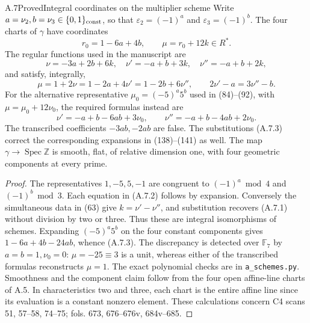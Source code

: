 \begin{statement}{A.7}{Proved}{Integral coordinates on the multiplier scheme}
Write $a=\nu_2,b=\nu_3\in\{0,1\}_{\rm const}$, so that
$\varepsilon_2=(-1)^a$ and $\varepsilon_3=(-1)^b$. The four charts of
$\gamma$ have coordinates
\[
 r_0=1-6a+4b,\qquad \mu=r_0+12k\in R^*.
\]
The regular functions used in the manuscript are
\[
 \nu=-3a+2b+6k,\quad
 \nu'=-a+b+3k,\quad \nu''=-a+b+2k,                 \tag{A.7.1}
\]
and satisfy, integrally,
\[
 \mu=1+2\nu=1-2a+4\nu'=1-2b+6\nu'',\qquad
 2\nu'-a=3\nu''-b.                                \tag{A.7.2}
\]
For the alternative representative
$\mu_0=(-5)^a5^b$ used in (84)--(92), with
$\mu=\mu_0+12\nu_0$, the required formulas instead are
\[
 \nu'=-a+b-6ab+3\nu_0,\qquad
 \nu''=-a+b-4ab+2\nu_0.                            \tag{A.7.3}
\]
The transcribed coefficients $-3ab,-2ab$ are false. The substitutions
(A.7.3) correct the corresponding expansions in (138)--(141) as well.
The map $\gamma\to\operatorname{Spec}\mathbb Z$ is smooth, flat, of
relative dimension one, with four geometric components at every prime.
\end{statement}
\begin{proof}
The representatives $1,-5,5,-1$ are congruent to
$(-1)^a\bmod4$ and $(-1)^b\bmod3$. Each equation in (A.7.2) follows
by expansion. Conversely the simultaneous data in (63) give
$k=\nu'-\nu''$, and substitution recovers (A.7.1) without division
by two or three. Thus these are integral isomorphisms of schemes.
Expanding $(-5)^a5^b$ on the four constant components gives
$1-6a+4b-24ab$, whence (A.7.3). The discrepancy is detected over
$\mathbb F_7$ by $a=b=1,\nu_0=0$: $\mu=-25\equiv3$ is a unit,
whereas either of the transcribed formulas reconstructs $\mu=1$.
The exact polynomial checks are in \texttt{a\_schemes.py}.
Smoothness and the component claim follow from the four open
affine-line charts of A.5. In characteristics two and three, each
chart is the entire affine line since its evaluation is a constant
nonzero element. These calculations concern C4 scans 51, 57--58,
74--75; fols. 673, 676--676v, 684v--685.
\end{proof}

